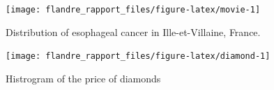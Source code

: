 \documentclass[twoside]{extreport}
\begin{document}
\begin{Shaded}
\begin{Highlighting}[]
\NormalTok{(}\SpecialCharTok{/}\SpecialCharTok{+}\SpecialCharTok{+} 
  \NormalTok{() }\SpecialCharTok{+} 
  \NormalTok{(}\SpecialCharTok{\textasciitilde{}} \NormalTok{)}
\end{Highlighting}
\end{Shaded}

\begin{figure}

{\centering \texttt{[image: flandre\_rapport\_files/figure-latex/movie-1]} 

}

\caption{Distribution of esophageal cancer in Ille-et-Villaine, France.}\label{fig:movie}
\end{figure}

\begin{Shaded}
\begin{Highlighting}[]
\NormalTok{(}\SpecialCharTok{+} 
  \NormalTok{()}
\end{Highlighting}
\end{Shaded}

\begin{figure}

{\centering \texttt{[image: flandre\_rapport\_files/figure-latex/diamond-1]} 

}

\caption{Histrogram of the price of diamonds}\label{fig:diamond}
\end{figure}

\begin{Shaded}
\begin{Highlighting}[]
\NormalTok{(}
  \NormalTok{(}  
\NormalTok{) }\SpecialCharTok{+}
  \NormalTok{() }\SpecialCharTok{+} 
  \NormalTok{(} \NormalTok{) }
\end{Highlighting}
\end{Shaded}
\end{document}
